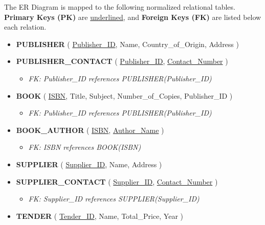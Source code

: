\documentclass[12pt,a3paper]{article}
\begin{document}
\begin{enumerate}
\begin{tcolorbox}[enhanced,breakable,ansbox,colback=cA!4,colframe=cA,boxrule=0.8pt,arc=5pt,title={\textbf{Answer}},fonttitle=\bfseries\color{white},colbacktitle=cA]
The ER Diagram is mapped to the following normalized relational tables. \textbf{Primary Keys (PK)} are \underline{underlined}, and \textbf{Foreign Keys (FK)} are listed below each relation.

\begin{itemize}[leftmargin=1.5em, itemsep=1em]
    \item \textbf{PUBLISHER} ( \underline{Publisher\_ID}, Name, Country\_of\_Origin, Address )
    \item \textbf{PUBLISHER\_CONTACT} ( \underline{Publisher\_ID}, \underline{Contact\_Number} )
        \begin{itemize}[label={--}, noitemsep, topsep=2pt]
            \item \textit{FK: Publisher\_ID references PUBLISHER(Publisher\_ID)}
        \end{itemize}

    \item \textbf{BOOK} ( \underline{ISBN}, Title, Subject, Number\_of\_Copies, Publisher\_ID )
        \begin{itemize}[label={--}, noitemsep, topsep=2pt]
            \item \textit{FK: Publisher\_ID references PUBLISHER(Publisher\_ID)}
        \end{itemize}
    \item \textbf{BOOK\_AUTHOR} ( \underline{ISBN}, \underline{Author\_Name} )
        \begin{itemize}[label={--}, noitemsep, topsep=2pt]
            \item \textit{FK: ISBN references BOOK(ISBN)}
        \end{itemize}

    \item \textbf{SUPPLIER} ( \underline{Supplier\_ID}, Name, Address )
    \item \textbf{SUPPLIER\_CONTACT} ( \underline{Supplier\_ID}, \underline{Contact\_Number} )
        \begin{itemize}[label={--}, noitemsep, topsep=2pt]
            \item \textit{FK: Supplier\_ID references SUPPLIER(Supplier\_ID)}
        \end{itemize}

    \item \textbf{TENDER} ( \underline{Tender\_ID}, Name, Total\_Price, Year )


\end{itemize}
\end{tcolorbox}
\end{enumerate}
\end{document}
